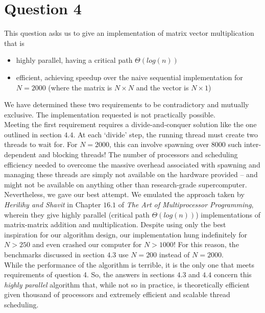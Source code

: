 \documentclass[11pt, letterpaper]{article}
\begin{document}
\newpage
\section*{Question 4}

This question asks us to give an implementation of matrix vector multiplication that is

\begin{itemize}
    \item highly parallel, having a critical path $\Theta(log(n))$
    \item efficient, achieving speedup over the naive sequential implementation for $N=2000$ (where the matrix is $N \times N$ and the vector is $N \times 1$)
\end{itemize}

We have determined these two requirements to be contradictory and mutually exclusive. The implementation requested is not practically possible.\\

Meeting the first requirement requires a divide-and-conquer solution like the one outlined in section $4.4$. At each `divide' step, the running thread must create two threads to wait for. For $N=2000$, this can involve spawning over 8000 such inter-dependent and blocking threads! The number of processors and scheduling efficiency needed to overcome the massive overhead associated with spawning and managing these threads are simply not available on the hardware provided -- and might not be available on anything other than research-grade supercomputer.\\

Nevertheless, we gave our best attempt. We emulated the approach taken by \textit{Herilihy and Shavit} in Chapter $16.1$ of \textit{The Art of Multiprocessor Programming}, wherein they give highly parallel (critical path $\Theta(log(n))$) implementations of matrix-matrix addition and multiplication. Despite using only the best inspiration for our algorithm design, our implementation hung indefinitely for $N > 250$ and even crashed our computer for $N > 1000$! For this reason, the benchmarks discussed in section $4.3$ use $N=200$ instead of $N=2000$.\\

While the performance of the algorithm is terrible, it is the only one that meets requirements of question 4. So, the answers in sections $4.3$ and $4.4$ concern this \textit{highly parallel} algorithm that, while not so in practice, is theoretically efficient given thousand of processors and extremely efficient and scalable thread scheduling.\\
\end{document}
